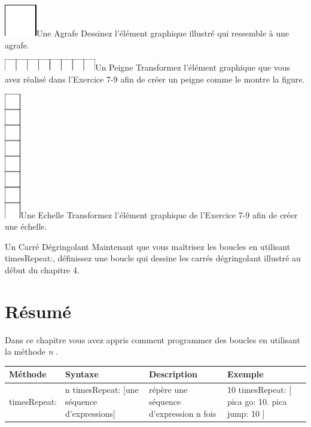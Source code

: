 \documentclass[a4paper,10pt,twoside]{book}
\begin{document}
\begin{exofigwithsizeandtitle}[0.65]{\includegraphics[width=.5cm]{loopSimpleElement}}{Une Agrafe} 
Dessinez  l’élément graphique illustré qui ressemble à une agrafe.
\end{exofigwithsizeandtitle}

\begin{exofigwithsizeandtitle}[0.55]{\includegraphics[width=4cm]{loopComb}}{Un Peigne} 
Transformez l’élément graphique que vous avez réalisé dans l’Exercice 7-9 afin de créer un peigne comme le montre la figure.
\end{exofigwithsizeandtitle}

\begin{exofigwithsizeandtitle}[0.65]{\includegraphics[width=0.7cm]{loopLadder}}{Une Echelle}
Transformez l’élément graphique de  l’Exercice 7-9 afin de créer une échelle. 
\end{exofigwithsizeandtitle}

\begin{exonofigtitle}{Un Carré Dégringolant} 
Maintenant que vous maîtrisez les boucles en utilisant timesRepeat:, définissez  une boucle qui dessine 
les carrés dégringolant illustré au début du chapitre 4. 
\end{exonofigtitle}


\section{Résumé} 

Dans ce chapitre vous avez appris comment programmer des boucles en utilisant la méthode \emph{n} . 

\vspace*{5mm}
\noindent
\setlength{\extrarowheight}{1mm}
{\small \begin{tabular}{p{14mm}p{23mm}p{45mm}p{22mm}}
\hline
\textbf{Méthode} & \textbf{Syntaxe} & \textbf{Description} & \textbf{Exemple}\\
\hline
\textsf{timesRepeat:} & \textsf{n timesRepeat: [une séquence d'expressions]} & répère une séquence d'expression n fois & 
\textsf{10 timesRepeat: [ pica go: 10. 
pica jump: 10 ]}\\
\hline
\end{tabular}}









\ifx\wholebook\relax\else
\end{document}

